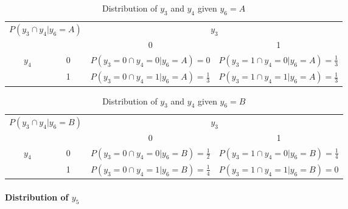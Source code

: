 \documentclass{article}
\begin{document}
\begin{table}[H]
\centering
\begin{tabular}{|cc|cc|}
\hline
\multicolumn{2}{|c|}{\multirow{2}{*}{$P(y_3 \cap y_4|y_6=A)$}} & \multicolumn{2}{c|}{$y_3$}                     \\ \cline{3-4} 
\multicolumn{2}{|c|}{}                                   & \multicolumn{1}{c|}{0}           & 1           \\ \hline
\multicolumn{1}{|c|}{\multirow{2}{*}{$y_4$}}     & 0     & \multicolumn{1}{c|}{$P(y_3=0 \cap y_4=0|y_6=A) =0$} & $P(y_3=1 \cap y_4=0|y_6=A) = \frac{1}{3}$ \\ \cline{2-4} 
\multicolumn{1}{|c|}{}                           & 1     & \multicolumn{1}{c|}{$P(y_3=0 \cap y_4=1|y_6=A) =\frac{1}{3}$} & $P(y_3=1 \cap y_4=1|y_6=A) =\frac{1}{3}$ \\ \hline
\end{tabular}
\caption{Distribution of $y_3$ and $y_4$ given $y_6=A$}
\end{table}

\begin{table}[H]
\centering
\begin{tabular}{|cc|cc|}
\hline
\multicolumn{2}{|c|}{\multirow{2}{*}{$P(y_3 \cap y_4|y_6=B)$}} & \multicolumn{2}{c|}{$y_3$}                     \\ \cline{3-4}
\multicolumn{2}{|c|}{}                                   & \multicolumn{1}{c|}{0}           & 1           \\ \hline
\multicolumn{1}{|c|}{\multirow{2}{*}{$y_4$}}     & 0     & \multicolumn{1}{c|}{$P(y_3=0 \cap y_4=0|y_6=B) = \frac{1}{2}$} & $P(y_3=1 \cap y_4=0|y_6=B) =\frac{1}{4}$ \\ \cline{2-4} 
\multicolumn{1}{|c|}{}                           & 1     & \multicolumn{1}{c|}{$P(y_3=0 \cap y_4=1|y_6=B) =\frac{1}{4}$} & $P(y_3=1 \cap y_4=1|y_6=B) =0$ \\ \hline
\end{tabular}
\caption{Distribution of $y_3$ and $y_4$ given $y_6=B$}
\end{table}



\paragraph{Distribution of $y_5$}
\paragraph{}
\end{document}
